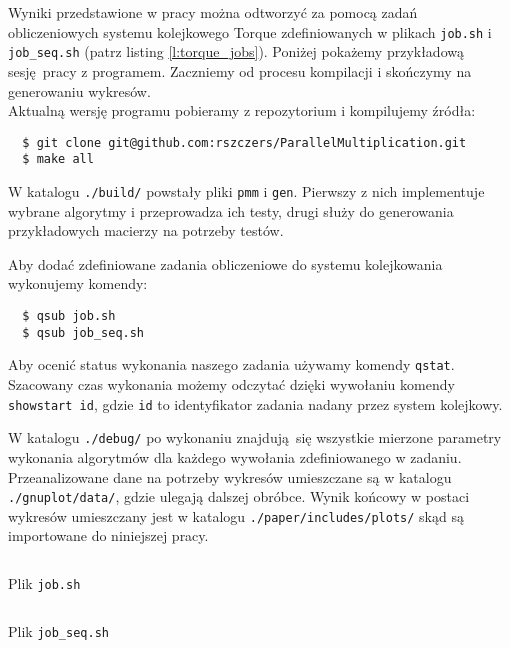 Wyniki przedstawione w pracy można odtworzyć za pomocą zadań obliczeniowych systemu kolejkowego Torque zdefiniowanych w plikach \texttt{job.sh} i \texttt{job\_seq.sh} (patrz listing \ref{l:torque_jobs}). Poniżej pokażemy przykładową sesję pracy z programem. Zaczniemy od procesu kompilacji i skończymy na generowaniu wykresów.\\

Aktualną wersję programu pobieramy z repozytorium i kompilujemy źródła:
\begin{verbatim}
  $ git clone git@github.com:rszczers/ParallelMultiplication.git
  $ make all
\end{verbatim}

\noindent W katalogu \texttt{./build/} powstały pliki \texttt{pmm} i \texttt{gen}. Pierwszy z nich implementuje wybrane algorytmy i przeprowadza ich testy, drugi służy do generowania przykładowych macierzy na potrzeby testów.

Aby dodać zdefiniowane zadania obliczeniowe do systemu kolejkowania wykonujemy komendy:
\begin{verbatim}
  $ qsub job.sh
  $ qsub job_seq.sh
\end{verbatim}

Aby ocenić status wykonania naszego zadania używamy komendy \texttt{qstat}. Szacowany czas wykonania możemy odczytać dzięki wywołaniu komendy\\ \texttt{showstart id}, gdzie \texttt{id} to identyfikator zadania nadany przez system kolejkowy.


W katalogu \texttt{./debug/} po wykonaniu znajdują się wszystkie mierzone parametry wykonania algorytmów dla każdego wywołania zdefiniowanego w zadaniu. Przeanalizowane dane na potrzeby wykresów umieszczane są w katalogu \texttt{./gnuplot/data/}, gdzie ulegają dalszej obróbce. Wynik końcowy w postaci wykresów umieszczany jest w katalogu \texttt{./paper/includes/plots/} skąd są importowane do niniejszej pracy.

\begin{listing}[H]
\footnotesize
\inputminted{bash}{includes/listings/job.sh}
\caption{Plik \texttt{job.sh}}
\label{l:torque_jobs}
\end{listing}

\begin{listing}[H]
\footnotesize
\inputminted{bash}{includes/listings/job_seq.sh}
\caption{Plik \texttt{job\_seq.sh}}
\label{l:torque_jobs}
\end{listing}



